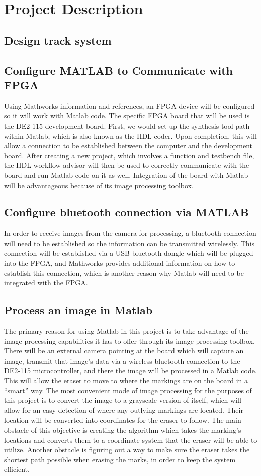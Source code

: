 \documentclass{IEEEtran}					%
\begin{document}
	\section{Project Description}
	\subsection{Design track system}
	\subsection{Configure MATLAB to Communicate with FPGA}
	Using Mathworks information and references, an FPGA device will be configured so it will work with Matlab code. The specific FPGA board that will be used is the DE2-115 development board. First, we would set up the synthesis tool path within Matlab, which is also known as the HDL coder. Upon completion, this will allow a connection to be established between the computer and the development board. After creating a new project, which involves a function and testbench file, the HDL workflow advisor will then be used to correctly communicate with the board and run Matlab code on it as well. Integration of the board with Matlab will be advantageous because of its image processing toolbox.
	
	\subsection{Configure bluetooth connection via MATLAB}
	In order to receive images from the camera for processing, a bluetooth connection will need to be established so the information can be transmitted wirelessly. This connection will be established via a USB bluetooth dongle which will be plugged into the FPGA, and Mathworks provides additional information on how to establish this connection, which is another reason why Matlab will need to be integrated with the FPGA.
	\subsection{Process an image in Matlab}
	The primary reason for using Matlab in this project is to take advantage of the image processing capabilities it has to offer through its image processing toolbox. There will be an external camera pointing at the board which will capture an image, transmit that image{\rq}s data via a wireless bluetooth connection to the DE2-115 microcontroller, and there the image will be processed in a Matlab code. This will allow the eraser to move to where the markings are on the board in a ``smart'' way. The most convenient mode of image processing for the purposes of this project is to convert the image to a grayscale version of itself, which will allow for an easy detection of where any outlying markings are located. Their location will be converted into coordinates for the eraser to follow. The main obstacle of this objective is creating the algorithm which takes the marking{\rq}s locations and converts them to a coordinate system that the eraser will be able to utilize. Another obstacle is figuring out a way to make sure the eraser takes the shortest path possible when erasing the marks, in order to keep the system efficient.
	
\end{document}
